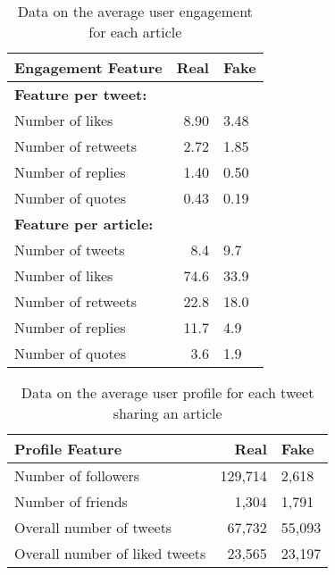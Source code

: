 \documentclass[11pt]{article}
\begin{document}
\begin{table*}
\centering
\caption{Data on the average user engagement for each article}
\begin{tabular}{|f|r|f|}
\hline
\textbf{Engagement Feature}&\textbf{Real}&\textbf{Fake}\\
\hline
\textbf{Feature per tweet:} &&\\
Number of likes & 8.90 & 3.48\\
Number of retweets & 2.72 & 1.85 \\
Number of replies & 1.40 & 0.50\\
Number of quotes & 0.43 & 0.19\\
\hline
\textbf{Feature per article:} & & \\
Number of tweets & 8.4 & 9.7 \\
Number of likes & 74.6 & 33.9 \\
Number of retweets & 22.8 & 18.0\\
Number of replies & 11.7 & 4.9 \\
Number of quotes & 3.6 & 1.9 \\

\hline

\end{tabular}

\label{tab:engagement}
\end{table*}

\begin{table*}
\centering
\caption{Data on the average user profile for each tweet sharing an article}
\begin{tabular}{|f|r|f|}
\hline
\textbf{Profile Feature}&\textbf{Real}&\textbf{Fake}\\
\hline
Number of followers & 129,714 & 2,618\\
Number of friends & 1,304 & 1,791 \\
Overall number of tweets & 67,732 & 55,093\\
Overall number of liked tweets & 23,565 & 23,197\\

\hline

\end{tabular}

\label{tab:user}
\end{table*}
\end{document}
